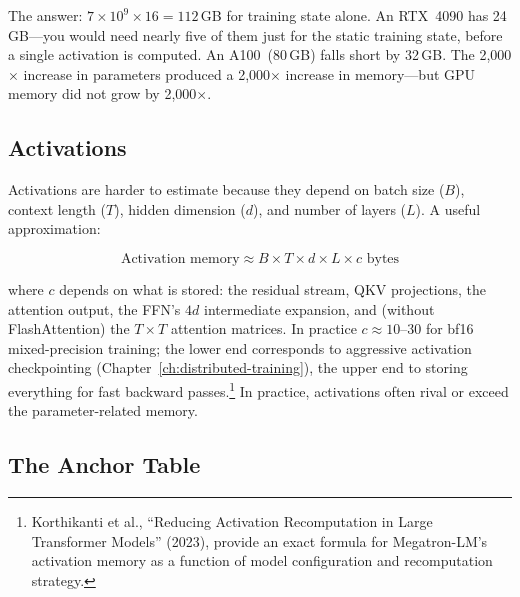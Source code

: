 \medskip
\noindent{}
\medskip

\noindent The answer: $7 \times 10^9 \times 16 = 112$\,GB for training state alone. An RTX~4090 has 24\,GB---you would need nearly five of them just for the static training state, before a single activation is computed. An A100~(80\,GB) falls short by 32\,GB. The 2,000$\times$ increase in parameters produced a 2,000$\times$ increase in memory---but GPU memory did not grow by 2,000$\times$.

\subsection{Activations}

Activations are harder to estimate because they depend on batch size ($B$), context length ($T$), hidden dimension ($d$), and number of layers ($L$). A useful approximation:

\[
  \text{Activation memory} \approx B \times T \times d \times L \times c \text{ bytes}
\]

where $c$ depends on what is stored: the residual stream, QKV projections, the attention output, the FFN's $4d$ intermediate expansion, and (without FlashAttention) the $T \times T$ attention matrices. In practice $c \approx 10$--$30$ for bf16 mixed-precision training; the lower end corresponds to aggressive activation checkpointing (Chapter~\ref{ch:distributed-training}), the upper end to storing everything for fast backward passes.\footnote{Korthikanti et al., ``Reducing Activation Recomputation in Large Transformer Models'' (2023), provide an exact formula for Megatron-LM's activation memory as a function of model configuration and recomputation strategy.} In practice, activations often rival or exceed the parameter-related memory.

\subsection{The Anchor Table}

